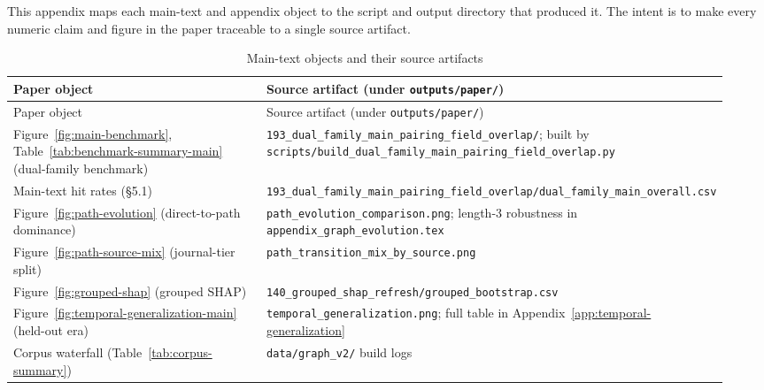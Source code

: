 \documentclass[11pt]{article}
\begin{document}
This appendix maps each main-text and appendix object to the script and output
directory that produced it. The intent is to make every numeric claim and figure
in the paper traceable to a single source artifact.

\begin{longtable}{L{0.36\linewidth}L{0.58\linewidth}}
  \caption{Main-text objects and their source artifacts}
  \label{tab:repro-main}\\
  \toprule
  Paper object & Source artifact (under \texttt{outputs/paper/}) \\
  \midrule
  \endfirsthead
  \toprule
  Paper object & Source artifact (under \texttt{outputs/paper/}) \\
  \midrule
  \endhead
  Figure~\ref{fig:main-benchmark}, Table~\ref{tab:benchmark-summary-main} (dual-family benchmark) & \texttt{193\_dual\_family\_main\_pairing\_field\_overlap/}; built by \texttt{scripts/build\_dual\_family\_main\_pairing\_field\_overlap.py} \\
  Main-text hit rates (\S5.1) & \texttt{193\_dual\_family\_main\_pairing\_field\_overlap/dual\_family\_main\_overall.csv} \\
  Figure~\ref{fig:path-evolution} (direct-to-path dominance) & \texttt{path\_evolution\_comparison.png}; length-3 robustness in \texttt{appendix\_graph\_evolution.tex} \\
  Figure~\ref{fig:path-source-mix} (journal-tier split) & \texttt{path\_transition\_mix\_by\_source.png} \\
  Figure~\ref{fig:grouped-shap} (grouped SHAP) & \texttt{140\_grouped\_shap\_refresh/grouped\_bootstrap.csv} \\
  Figure~\ref{fig:temporal-generalization-main} (held-out era) & \texttt{temporal\_generalization.png}; full table in Appendix~\ref{app:temporal-generalization} \\
  Corpus waterfall (Table~\ref{tab:corpus-summary}) & \texttt{data/graph\_v2/} build logs \\
  \bottomrule
\end{longtable}
\end{document}
